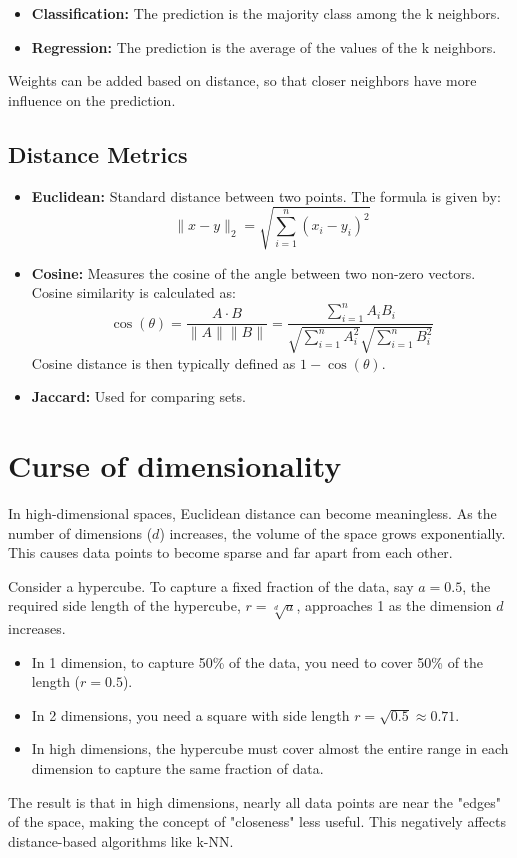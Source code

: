 \documentclass{article}
\begin{document}
\begin{multicols}{2}
	\begin{itemize}
		\item \textbf{Classification:} The prediction is the majority class among the k neighbors.
		\item \textbf{Regression:} The prediction is the average of the values of the k neighbors.
	\end{itemize}

	Weights can be added based on distance, so that closer neighbors have more influence on the prediction.

	\subsection{Distance Metrics}
	\begin{itemize}
		\item \textbf{Euclidean:} Standard distance between two points. The formula is given by:
		      $$ \|x-y\|_2 = \sqrt{\sum_{i=1}^{n} (x_i - y_i)^2} $$

		\item \textbf{Cosine:} Measures the cosine of the angle between two non-zero vectors. Cosine similarity is calculated as:
		      $$ \cos(\theta) = \frac{A \cdot B}{\|A\| \|B\|} = \frac{\sum_{i=1}^{n} A_i B_i}{\sqrt{\sum_{i=1}^{n} A_i^2} \sqrt{\sum_{i=1}^{n} B_i^2}} $$
		      Cosine distance is then typically defined as $1 - \cos(\theta)$.

		\item \textbf{Jaccard:} Used for comparing sets.
	\end{itemize}

	\section{Curse of dimensionality}
	In high-dimensional spaces, Euclidean distance can become meaningless.  As the number of dimensions ($d$) increases, the volume of the space grows exponentially.  This causes data points to become sparse and far apart from each other.

	Consider a hypercube. To capture a fixed fraction of the data, say $a=0.5$, the required side length of the hypercube, $r = \sqrt[d]{a}$, approaches 1 as the dimension $d$ increases.
	\begin{itemize}
		\item In 1 dimension, to capture 50\% of the data, you need to cover 50\% of the length ($r=0.5$).
		\item In 2 dimensions, you need a square with side length $r = \sqrt{0.5} \approx 0.71$.
		\item In high dimensions, the hypercube must cover almost the entire range in each dimension to capture the same fraction of data.
	\end{itemize}
	The result is that in high dimensions, nearly all data points are near the "edges" of the space, making the concept of "closeness" less useful.  This negatively affects distance-based algorithms like k-NN.


\end{multicols}
\end{document}
